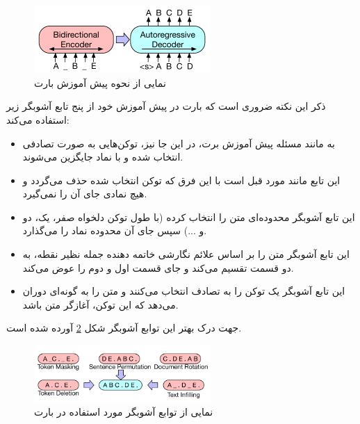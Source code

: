  \begin{figure}[h]
	\centering
	\includegraphics[width=0.6\textwidth]{images/chap3/bart_seq2seq.png}
	\caption[نمایی از نحوه پیش آموزش بارت]
	{
		نمایی از نحوه پیش آموزش بارت
		\cite{lewis2019bart}
	}
	\label{fig:chap3:bart_pretraining}
\end{figure}

ذکر این نکته ضروری است که بارت در پیش آموزش خود از پنج تابع آشوبگر زیر استفاده می‌کند:

\begin{itemize}
	\item 
	\textbf{
}

به مانند مسئله پیش آموزش برت، در این جا نیز، توکن‌هایی به صورت تصادفی انتخاب شده و با نماد
\lr{\_}
جایگزین می‌شوند.

\item 
\textbf{
}

این تابع مانند مورد قبل است با این فرق که توکن انتخاب شده حذف می‌گردد و هیچ نمادی جای آن را نمی‌گیرد.

\item 
\textbf{
}

این تابع آشوبگر محدوده‌ای متن را انتخاب کرده (با طول توکن‌ دلخواه صفر، یک، دو و ...) سپس جای آن محدوده نماد 
\lr{\_}
را می‌گذارد.

\item 
\textbf{
} 

	این تابع آشوبگر متن را بر اساس علائم نگارشی خاتمه دهنده جمله نظیر نقطه، به دو قسمت تقسیم می‌کند و جای قسمت اول و دوم را عوض می‌کند.
\item 
\textbf{
} 	

این تابع آشوبگر یک توکن را به تصادف انتخاب می‌کنند و متن را به گونه‌ای دوران می‌دهد که این توکن، آغازگر متن باشد.
\end{itemize}

جهت درک بهتر این توابع آشوبگر شکل
\ref{fig:chap3:bart_noising_function}
آورده شده است.
 \begin{figure}[h]
	\centering
	\includegraphics[width=0.6\textwidth]{images/chap3/bart_noising_function.png}
	\caption[نمایی از توابع آشوبگر مورد استفاده در بارت]
	{
		نمایی از توابع آشوبگر مورد استفاده در بارت
		\cite{lewis2019bart}
	}
	\label{fig:chap3:bart_noising_function}
\end{figure}

